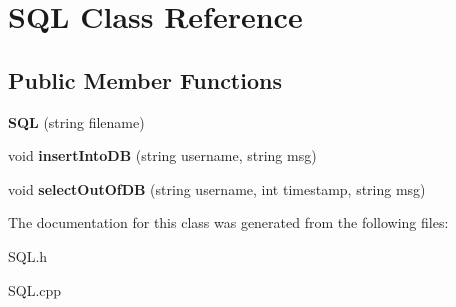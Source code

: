 \hypertarget{classSQL}{\section{\-S\-Q\-L \-Class \-Reference}
\label{classSQL}
}
\subsection*{\-Public \-Member \-Functions}
\begin{DoxyCompactItemize}
\item 
\hypertarget{classSQL_a6c9eb70e74269d923dd578392153dc73}{{\bfseries \-S\-Q\-L} (string filename)}\label{classSQL_a6c9eb70e74269d923dd578392153dc73}

\item 
\hypertarget{classSQL_a887c01db09d7b4358a1965008305343d}{void {\bfseries insert\-Into\-D\-B} (string username, string msg)}\label{classSQL_a887c01db09d7b4358a1965008305343d}

\item 
\hypertarget{classSQL_a5d36a7b54983267bde65179fdfbb066b}{void {\bfseries select\-Out\-Of\-D\-B} (string username, int timestamp, string msg)}\label{classSQL_a5d36a7b54983267bde65179fdfbb066b}

\end{DoxyCompactItemize}


\-The documentation for this class was generated from the following files\-:\begin{DoxyCompactItemize}
\item 
\-S\-Q\-L.\-h\item 
\-S\-Q\-L.\-cpp\end{DoxyCompactItemize}
